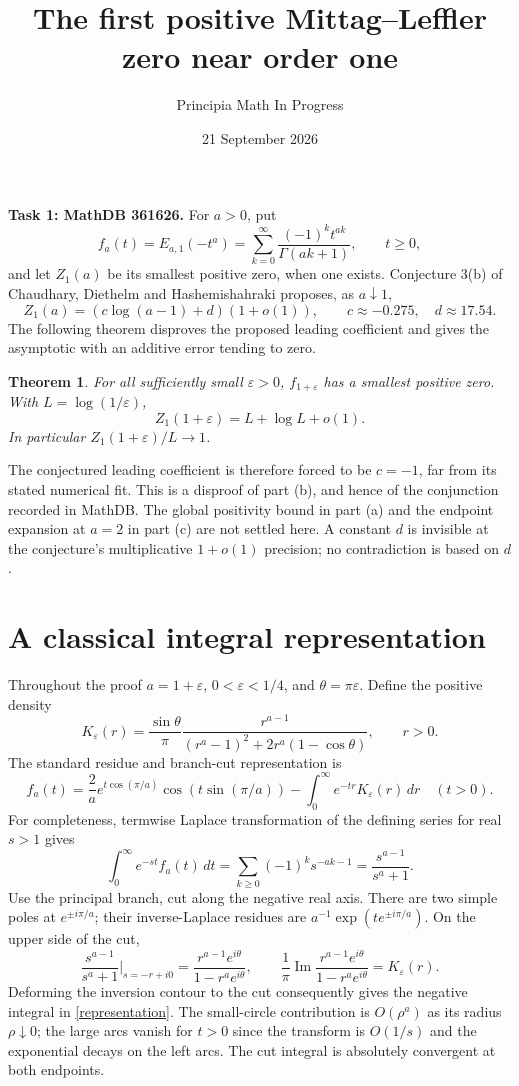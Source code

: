\documentclass[11pt]{article}
\title{The first positive Mittag--Leffler zero near order one}
\author{Principia Math In Progress}
\date{21 September 2026}
\newtheorem{theorem}{Theorem}
\begin{document}
\maketitle
\noindent\textbf{Task 1: MathDB 361626.}
For $a>0$, put
\[
 f_a(t)=E_{a,1}(-t^a)=\sum_{k=0}^{\infty}
             \frac{(-1)^k t^{ak}}{\Gamma(ak+1)},\qquad t\geq0,
\]
and let $Z_1(a)$ be its smallest positive zero, when one exists.
Conjecture 3(b) of Chaudhary, Diethelm and Hashemishahraki
\cite{CDH} proposes, as $a\downarrow1$,
\[
 Z_1(a)=(c\log(a-1)+d)(1+o(1)),
 \qquad c\approx-0.275,\quad d\approx17.54.
\]
The following theorem disproves the proposed leading coefficient and
gives the asymptotic with an additive error tending to zero.

\begin{theorem}\label{main}
For all sufficiently small $\varepsilon>0$, $f_{1+\varepsilon}$ has a
smallest positive zero. With $L=\log(1/\varepsilon)$,
\[
 \boxed{Z_1(1+\varepsilon)=L+\log L+o(1).}
\]
In particular $Z_1(1+\varepsilon)/L\to1$.
\end{theorem}

The conjectured leading coefficient is therefore forced to be $c=-1$,
far from its stated numerical fit. This is a disproof of part (b), and
hence of the conjunction recorded in MathDB. The global positivity
bound in part (a) and the endpoint expansion at $a=2$ in part (c) are
not settled here. A constant $d$ is invisible at the conjecture's
multiplicative $1+o(1)$ precision; no contradiction is based on $d$.

\section*{A classical integral representation}
Throughout the proof $a=1+\varepsilon$, $0<\varepsilon<1/4$, and
$\theta=\pi\varepsilon$. Define the positive density
\[
 K_\varepsilon(r)=\frac{\sin\theta}{\pi}
 \frac{r^{a-1}}{(r^a-1)^2+2r^a(1-\cos\theta)},\qquad r>0.
\]
The standard residue and branch-cut representation is
\begin{equation}\label{representation}
 f_a(t)=\frac2a e^{t\cos(\pi/a)}\cos(t\sin(\pi/a))
             -\int_0^\infty e^{-tr}K_\varepsilon(r)\,dr
 \quad(t>0).
\end{equation}
For completeness, termwise Laplace transformation of the defining
series for real $s>1$ gives
\[
 \int_0^\infty e^{-st}f_a(t)\,dt
 =\sum_{k\geq0}(-1)^k s^{-ak-1}
 =\frac{s^{a-1}}{s^a+1}.
\]
Use the principal branch, cut along the negative real axis. There are
two simple poles at $e^{\pm i\pi/a}$; their inverse-Laplace residues
are $a^{-1}\exp(t e^{\pm i\pi/a})$. On the upper side of the cut,
\[
 \frac{s^{a-1}}{s^a+1}\bigg|_{s=-r+i0}
 =\frac{r^{a-1}e^{i\theta}}{1-r^ae^{i\theta}},\qquad
 \frac1\pi\operatorname{Im}\frac{r^{a-1}e^{i\theta}}
                                     {1-r^ae^{i\theta}}
 =K_\varepsilon(r).
\]
Deforming the inversion contour to the cut consequently gives the
negative integral in \eqref{representation}. The small-circle
contribution is $O(\rho^a)$ as its radius $\rho\downarrow0$;
the large arcs vanish for $t>0$ since the transform is $O(1/s)$
and the exponential decays on the left arcs. The cut integral is
absolutely convergent at both endpoints.
\end{document}
